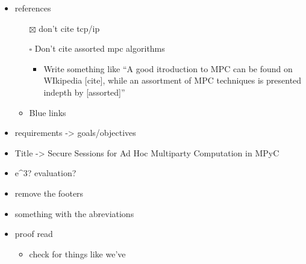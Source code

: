 \begin{itemize}
\tightlist
\item
  references

  \begin{itemize}
  \tightlist
  \item[$\boxtimes$]
    don't cite tcp/ip
  \item[$\square$]
    Don't cite assorted mpc algorithms

    \begin{itemize}
    \tightlist
    \item
      Write something like ``A good itroduction to MPC can be found on
      WIkipedia {[}cite{]}, while an assortment of MPC techniques is
      presented indepth by {[}assorted{]}''
    \end{itemize}
  \item
    Blue links
  \end{itemize}
\item
  requirements -\textgreater{} goals/objectives
\item
  Title -\textgreater{} Secure Sessions for Ad Hoc Multiparty
  Computation in MPyC
\item
  e\^{}3? evaluation?
\item
  remove the footers
\item
  something with the abreviations
\item
  proof read

  \begin{itemize}
  \tightlist
  \item
    check for things like we've
  \end{itemize}
\end{itemize}
